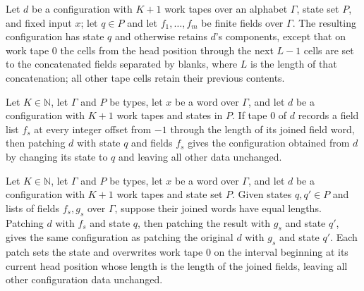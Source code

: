 \begin{definition}
\label{Turing.wl_patch}
\leanok
{}
Let $d$ be a configuration with $K+1$ work tapes over an alphabet $\Gamma$, state set
$P$, and fixed input $x$; let $q\in P$ and let $f_1,\ldots,f_m$ be finite fields over
$\Gamma$. The resulting configuration has state $q$ and otherwise retains $d$’s
components, except that on work tape $0$ the cells from the head position through the
next $L-1$ cells are set to the concatenated fields separated by blanks, where $L$ is
the length of that concatenation; all other tape cells retain their previous contents.
\end{definition}

\begin{theorem}
\label{Turing.wl_patch_self}
\leanok
{}
Let $K\in\mathbb{N}$, let $\Gamma$ and $P$ be types, let $x$ be a word over $\Gamma$,
and let $d$ be a configuration with $K+1$ work tapes and states in $P$. If tape $0$ of
$d$ records a field list $f_s$ at every integer offset from $-1$ through the length of
its joined field word, then patching $d$ with state $q$ and fields $f_s$ gives the
configuration obtained from $d$ by changing its state to $q$ and leaving all other data
unchanged.
\end{theorem}

\begin{theorem}
\label{Turing.wl_patch_patch}
\leanok
{}
Let $K\in\mathbb{N}$, let $\Gamma$ and $P$ be types, let $x$ be a word over $\Gamma$,
and let $d$ be a configuration with $K+1$ work tapes and state set $P$. Given states
$q,q'\in P$ and lists of fields $f_s,g_s$ over $\Gamma$, suppose their joined words have
equal lengths. Patching $d$ with $f_s$ and state $q$, then patching the result with
$g_s$ and state $q'$, gives the same configuration as patching the original $d$ with
$g_s$ and state $q'$. Each patch sets the state and overwrites work tape $0$ on the
interval beginning at its current head position whose length is the length of the joined
fields, leaving all other configuration data unchanged.
\end{theorem}

